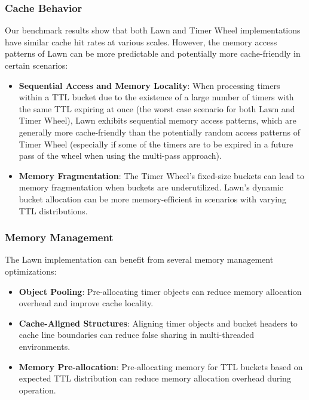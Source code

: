 \documentclass[conference]{IEEEtran}
\begin{document}
\subsubsection{Cache Behavior}
Our benchmark results show that both Lawn and Timer Wheel implementations have similar cache hit rates at various scales. However, the memory access patterns of Lawn can be more predictable and potentially more cache-friendly in certain scenarios:

\begin{itemize}
    \item \textbf{Sequential Access and Memory Locality}: When processing timers within a TTL bucket due to the existence of a large number of timers with the same TTL expiring at once (the worst case scenario for both Lawn and Timer Wheel), Lawn exhibits sequential memory access patterns, which are generally more cache-friendly than the potentially random access patterns of Timer Wheel (especially if some of the timers are to be expired in a future pass of the wheel when using the multi-pass approach).
    
    \item \textbf{Memory Fragmentation}: The Timer Wheel's fixed-size buckets can lead to memory fragmentation when buckets are underutilized. Lawn's dynamic bucket allocation can be more memory-efficient in scenarios with varying TTL distributions.
\end{itemize}

\subsubsection{Memory Management}
The Lawn implementation can benefit from several memory management optimizations:

\begin{itemize}
    \item \textbf{Object Pooling}: Pre-allocating timer objects can reduce memory allocation overhead and improve cache locality.
    
    \item \textbf{Cache-Aligned Structures}: Aligning timer objects and bucket headers to cache line boundaries can reduce false sharing in multi-threaded environments.
    
    \item \textbf{Memory Pre-allocation}: Pre-allocating memory for TTL buckets based on expected TTL distribution can reduce memory allocation overhead during operation.
\end{itemize}
\end{document}
